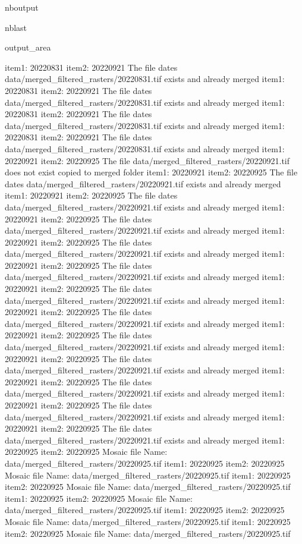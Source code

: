 \documentclass[letterpaper,10pt]{sphinxmanual}
\begin{document}
\begin{sphinxuseclass}{nboutput}
\begin{sphinxuseclass}{nblast}
{\begin{sphinxuseclass}{output_area}
\begin{sphinxuseclass}{}
\begin{sphinxVerbatim}[commandchars=\\\{\}]
item1:  20220831
item2:  20220921
The file dates data/merged\_filtered\_rasters/20220831.tif exists and already merged
item1:  20220831
item2:  20220921
The file dates data/merged\_filtered\_rasters/20220831.tif exists and already merged
item1:  20220831
item2:  20220921
The file dates data/merged\_filtered\_rasters/20220831.tif exists and already merged
item1:  20220831
item2:  20220921
The file dates data/merged\_filtered\_rasters/20220831.tif exists and already merged
item1:  20220921
item2:  20220925
The file data/merged\_filtered\_rasters/20220921.tif does not exist copied to merged folder
item1:  20220921
item2:  20220925
The file dates data/merged\_filtered\_rasters/20220921.tif exists and already merged
item1:  20220921
item2:  20220925
The file dates data/merged\_filtered\_rasters/20220921.tif exists and already merged
item1:  20220921
item2:  20220925
The file dates data/merged\_filtered\_rasters/20220921.tif exists and already merged
item1:  20220921
item2:  20220925
The file dates data/merged\_filtered\_rasters/20220921.tif exists and already merged
item1:  20220921
item2:  20220925
The file dates data/merged\_filtered\_rasters/20220921.tif exists and already merged
item1:  20220921
item2:  20220925
The file dates data/merged\_filtered\_rasters/20220921.tif exists and already merged
item1:  20220921
item2:  20220925
The file dates data/merged\_filtered\_rasters/20220921.tif exists and already merged
item1:  20220921
item2:  20220925
The file dates data/merged\_filtered\_rasters/20220921.tif exists and already merged
item1:  20220921
item2:  20220925
The file dates data/merged\_filtered\_rasters/20220921.tif exists and already merged
item1:  20220921
item2:  20220925
The file dates data/merged\_filtered\_rasters/20220921.tif exists and already merged
item1:  20220921
item2:  20220925
The file dates data/merged\_filtered\_rasters/20220921.tif exists and already merged
item1:  20220921
item2:  20220925
The file dates data/merged\_filtered\_rasters/20220921.tif exists and already merged
item1:  20220925
item2:  20220925
Mosaic file Name:  data/merged\_filtered\_rasters/20220925.tif
item1:  20220925
item2:  20220925
Mosaic file Name:  data/merged\_filtered\_rasters/20220925.tif
item1:  20220925
item2:  20220925
Mosaic file Name:  data/merged\_filtered\_rasters/20220925.tif
item1:  20220925
item2:  20220925
Mosaic file Name:  data/merged\_filtered\_rasters/20220925.tif
item1:  20220925
item2:  20220925
Mosaic file Name:  data/merged\_filtered\_rasters/20220925.tif
item1:  20220925
item2:  20220925
Mosaic file Name:  data/merged\_filtered\_rasters/20220925.tif

\end{sphinxVerbatim}
\end{sphinxuseclass}
\end{sphinxuseclass}}
\end{sphinxuseclass}
\end{sphinxuseclass}
\end{document}
